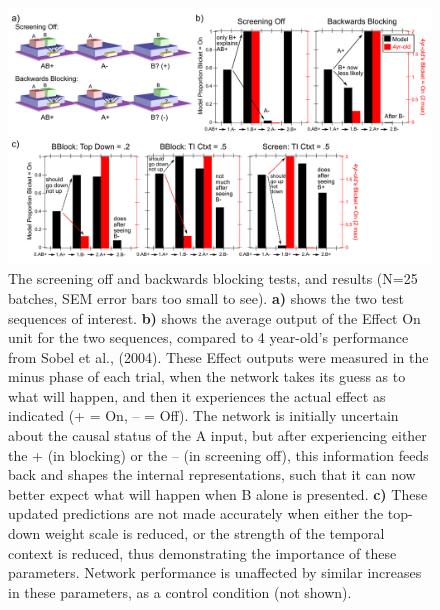 \documentclass[11pt,twoside]{article}
\newif\myifpdf
\begin{document}
\begin{figure}
\centering\includegraphics[width=6in]{figs/fig_blicket_stg04_bblock_all}
  \caption{\small The screening off and backwards blocking tests, and results (N=25 batches, SEM error bars too small to see).  {\bf a)} shows the two test sequences of interest.  {\bf b)} shows the average output of the Effect On unit for the two sequences, compared to 4 year-old's performance from Sobel et al., (2004).  These Effect outputs were measured in the minus phase of each trial, when the network takes its guess as to what will happen, and then it experiences the actual effect as indicated (+ = On, -- = Off).  The network is initially uncertain about the causal status of the A input, but after experiencing either the + (in blocking) or the -- (in screening off), this information feeds back and shapes the internal representations, such that it can now better expect what will happen when B alone is presented. {\bf c)} These updated predictions are not made accurately when either the top-down weight scale is reduced, or the strength of the temporal context is reduced, thus demonstrating the importance of these parameters.  Network performance is unaffected by similar increases in these parameters, as a control condition (not shown).}
  \label{fig.stg04}
\end{figure}
\end{document}
